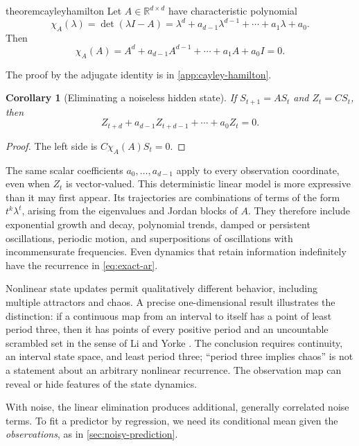 \documentclass[11pt,twoside]{article}
\newcommand{\R}{\mathbb R}
\newtheorem{corollary}[theorem]{Corollary}
\theoremstyle{definition}
\theoremstyle{remark}
\begin{document}
\begin{restatable}{theorem}{cayleyhamilton}
\label{thm:cayley-hamilton}
Let \(A\in\R^{d\times d}\) have characteristic polynomial
\[
 \chi_A(\lambda)=\det(\lambda I-A)
 =\lambda^d+a_{d-1}\lambda^{d-1}+\cdots+a_1\lambda+a_0.
\]
Then
\begin{equation}
 \chi_A(A)=A^d+a_{d-1}A^{d-1}+\cdots+a_1A+a_0I=0.
 \label{eq:cayley-hamilton}
\end{equation}
\end{restatable}

The proof by the adjugate identity is in \cref{app:cayley-hamilton}.

\begin{corollary}[Eliminating a noiseless hidden state]
\label{cor:exact-ar}
If \(S_{t+1}=AS_t\) and \(Z_t=CS_t\), then
\begin{equation}
 Z_{t+d}+a_{d-1}Z_{t+d-1}+\cdots+a_0Z_t=0.
 \label{eq:exact-ar}
\end{equation}
\end{corollary}
\begin{proof}
The left side is \(C\chi_A(A)S_t=0\).
\end{proof}

The same scalar coefficients \(a_0,\ldots,a_{d-1}\) apply to every
observation coordinate, even when \(Z_t\) is vector-valued.
This deterministic linear model is more expressive than it may first appear.
Its trajectories are combinations of terms of the form
\(t^k\lambda^t\), arising from the eigenvalues and Jordan blocks of \(A\).
They therefore include exponential growth and decay, polynomial trends,
damped or persistent oscillations, periodic motion, and superpositions of
oscillations with incommensurate frequencies. Even dynamics that retain
information indefinitely have the recurrence in \cref{eq:exact-ar}.

Nonlinear state updates permit qualitatively different behavior, including
multiple attractors and chaos. A precise one-dimensional result illustrates
the distinction: if a continuous map from an interval to itself has a point
of least period three, then it has points of every positive period and an
uncountable scrambled set in the sense of Li and Yorke
\citep{li1975}. The conclusion requires continuity, an interval state space,
and least period three; ``period three implies chaos'' is not a statement
about an arbitrary nonlinear recurrence. The observation map can reveal or
hide features of the state dynamics.

With noise, the linear elimination produces additional, generally correlated
noise terms.
To fit a predictor by regression, we need its conditional mean
given the \emph{observations}, as in \cref{sec:noisy-prediction}.
\end{document}
